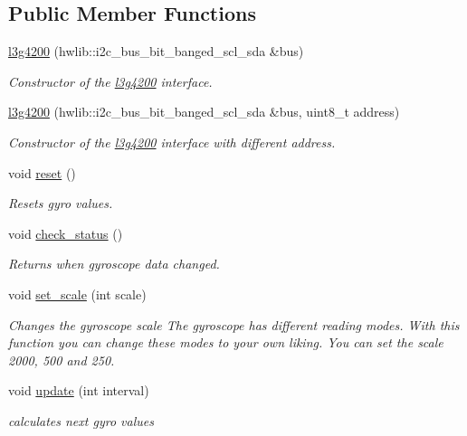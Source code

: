 \subsection*{Public Member Functions}
\begin{DoxyCompactItemize}
\item 
\hyperlink{classl3g4200_a95f0b60d26992cb2ee03730f38fa3308}{l3g4200} (hwlib\+::i2c\+\_\+bus\+\_\+bit\+\_\+banged\+\_\+scl\+\_\+sda \&bus)
\begin{DoxyCompactList}\small\item\em Constructor of the \hyperlink{classl3g4200}{l3g4200} interface. \end{DoxyCompactList}\item 
\hyperlink{classl3g4200_ada23aa5e15338e522092468a356b728c}{l3g4200} (hwlib\+::i2c\+\_\+bus\+\_\+bit\+\_\+banged\+\_\+scl\+\_\+sda \&bus, uint8\+\_\+t address)
\begin{DoxyCompactList}\small\item\em Constructor of the \hyperlink{classl3g4200}{l3g4200} interface with different address. \end{DoxyCompactList}\item 
void \hyperlink{classl3g4200_a89f0af632b2b19efc614339e479656ed}{reset} ()
\begin{DoxyCompactList}\small\item\em Resets gyro values. \end{DoxyCompactList}\item 
void \hyperlink{classl3g4200_af9dc9bd2b7086a49c1addddce238fcf8}{check\+\_\+status} ()
\begin{DoxyCompactList}\small\item\em Returns when gyroscope data changed. \end{DoxyCompactList}\item 
\mbox{\label{classl3g4200_a847c9ae3d63b5f0a46256fdd5d8d0d3b}} 
void \hyperlink{classl3g4200_a847c9ae3d63b5f0a46256fdd5d8d0d3b}{set\+\_\+scale} (int scale)
\begin{DoxyCompactList}\small\item\em Changes the gyroscope scale  The gyroscope has different reading modes. With this function you can change these modes to your own liking. You can set the scale 2000, 500 and 250. \end{DoxyCompactList}\item 
void \hyperlink{classl3g4200_affd107a9d8862f7687f1eb3c4fd74ea0}{update} (int interval)
\begin{DoxyCompactList}\small\item\em calculates next gyro values \end{DoxyCompactList}\item 

\end{DoxyCompactItemize}
